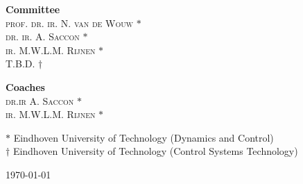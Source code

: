 \documentclass[DC2017114Bouma.tex]{subfiles}
\begin{document}
\begin{minipage}[t]{0.4\textwidth}
	\begin{flushleft} 
		\textbf{Committee}\\
		\textsc{prof. dr. ir. N. van de Wouw} $*$\\
		\textsc{dr. ir. A. Saccon} $*$\\
		\textsc{ir. M.W.L.M. Rijnen} $*$\\
		\textsc{T.B.D.} $\dagger$
	\end{flushleft}
\end{minipage}
\hfill
\begin{minipage}[t]{0.4\textwidth}
	\begin{flushright} 
		\textbf{Coaches}\\
		\textsc{dr.ir A. Saccon} $*$\\
		\textsc{ir. M.W.L.M. Rijnen} $*$\\
	\end{flushright}
\end{minipage}
\vfill

{\small $*$ Eindhoven University of Technology (Dynamics and Control)}\\
{\small $\dagger$ Eindhoven University of Technology (Control Systems Technology)}
\bigskip

\today
\end{document}
